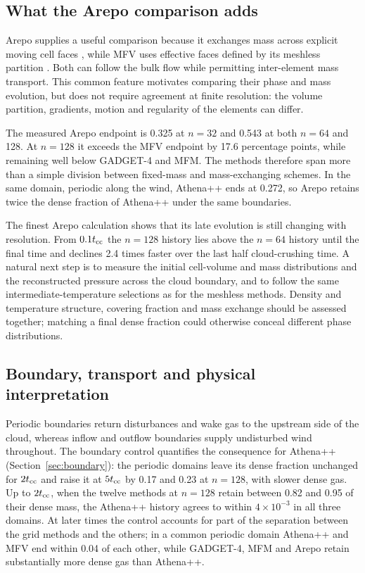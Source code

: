 \documentclass[twocolumn,apj,numberedappendix]{openjournal}
\begin{document}
\subsection{What the Arepo comparison adds}
Arepo supplies a useful comparison because it exchanges mass across explicit moving cell faces \citep{Springel2010}, while MFV uses effective faces defined by its meshless partition \citep{Hopkins2015}. Both can follow the bulk flow while permitting inter-element mass transport. This common feature motivates comparing their phase and mass evolution, but does not require agreement at finite resolution: the volume partition, gradients, motion and regularity of the elements can differ.

The measured Arepo endpoint is 0.325 at $n=32$ and 0.543 at both $n=64$ and 128. At $n=128$ it exceeds the MFV endpoint by 17.6 percentage points, while remaining well below GADGET-4 and MFM. The methods therefore span more than a simple division between fixed-mass and mass-exchanging schemes. In the same domain, periodic along the wind, Athena++ ends at 0.272, so Arepo retains twice the dense fraction of Athena++ under the same boundaries.

The finest Arepo calculation shows that its late evolution is still changing with resolution. From $0.1t_{\rm cc}$ the $n=128$ history lies above the $n=64$ history until the final time and declines 2.4 times faster over the last half cloud-crushing time. A natural next step is to measure the initial cell-volume and mass distributions and the reconstructed pressure across the cloud boundary, and to follow the same intermediate-temperature selections as for the meshless methods. Density and temperature structure, covering fraction and mass exchange should be assessed together; matching a final dense fraction could otherwise conceal different phase distributions.

\subsection{Boundary, transport and physical interpretation}
Periodic boundaries return disturbances and wake gas to the upstream side of the cloud, whereas inflow and outflow boundaries supply undisturbed wind throughout. The boundary control quantifies the consequence for Athena++ (Section~\ref{sec:boundary}): the periodic domains leave its dense fraction unchanged for $2t_{\rm cc}$ and raise it at $5t_{\rm cc}$ by 0.17 and 0.23 at $n=128$, with slower dense gas. Up to $2t_{\rm cc}$, when the twelve methods at $n=128$ retain between 0.82 and 0.95 of their dense mass, the Athena++ history agrees to within $4\times10^{-3}$ in all three domains. At later times the control accounts for part of the separation between the grid methods and the others; in a common periodic domain Athena++ and MFV end within 0.04 of each other, while GADGET-4, MFM and Arepo retain substantially more dense gas than Athena++.
\end{document}
